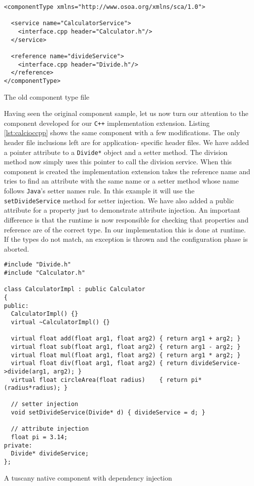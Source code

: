 \begin{listing}
\begin{verbatim}
<componentType xmlns="http://www.osoa.org/xmlns/sca/1.0">

  <service name="CalculatorService">
    <interface.cpp header="Calculator.h"/>
  </service>

  <reference name="divideService">
    <interface.cpp header="Divide.h"/>
  </reference>
</componentType>
\end{verbatim}
\caption{The old component type file}
\label{lst:calccppccomponenttype}
\end{listing}

Having seen the original component sample, let us now turn our attention to the component
developed for our \texttt{C++} implementation extension. Listing \ref{lst:calcioccpp} shows the same
component with a few modifications. The only header file inclusions left are for application-
specific header files. We have added a pointer attribute to a \texttt{Divide*} object and a
setter method. The division method now simply uses this pointer to call the division service.
When this component is created the implementation extension takes the reference name and
tries to find an attribute with the same name or a setter method whose name follows \texttt{Java}'s
setter names rule. In this example it will use the \texttt{setDivideService} method for
setter injection. We have also added a public attribute for a property just to demonstrate
attribute injection. An important difference is that the runtime is now responsible for
checking that properties and reference are of the correct type. In our implementation this
is done at runtime. If the types do not match, an exception is thrown and the configuration
phase is aborted.

\begin{listing}
\begin{verbatim}
#include "Divide.h"
#include "Calculator.h"

class CalculatorImpl : public Calculator
{
public:
  CalculatorImpl() {}
  virtual ~CalculatorImpl() {}

  virtual float add(float arg1, float arg2) { return arg1 + arg2; }
  virtual float sub(float arg1, float arg2) { return arg1 - arg2; }
  virtual float mul(float arg1, float arg2) { return arg1 * arg2; }
  virtual float div(float arg1, float arg2) { return divideService->divide(arg1, arg2); }
  virtual float circleArea(float radius)    { return pi*(radius*radius); }

  // setter injection
  void setDivideService(Divide* d) { divideService = d; }

  // attribute injection
  float pi = 3.14;
private:
  Divide* divideService;
};
\end{verbatim}
\caption{A tuscany native component with dependency injection}
\label{lst:calcioccpp}
\end{listing}

